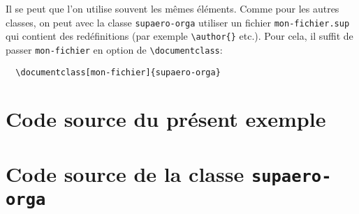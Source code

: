 \documentclass[french]{supaero-orga}
\begin{document}
Il se peut que l'on utilise souvent les mêmes éléments. Comme pour les
autres classes, on peut avec la classe \texttt{supaero-orga} utiliser
un fichier \texttt{mon-fichier.sup} qui contient des redéfinitions
(par exemple \verb!\author{}! etc.). Pour cela, il suffit de passer
\verb!mon-fichier! en option de \verb!\documentclass!:

\begin{verbatim}
  \documentclass[mon-fichier]{supaero-orga}
\end{verbatim}

\section{Code source du présent exemple}



\section{Code source de la classe \texttt{supaero-orga}}
\label{sec:code-source}


\end{document}
